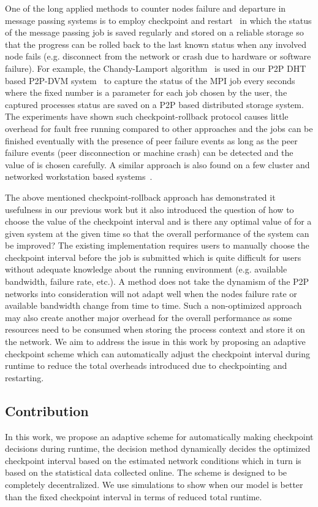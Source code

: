\documentclass[times, 12pt, onecolumn]{article}
\begin{document}
One of the long applied methods to counter nodes failure and departure in message passing systems is to 
employ checkpoint and restart~\cite{DBLP:journals/csur/ElnozahyAWJ02,ChandyL85} in which the status of the 
message passing job is saved regularly and stored on a reliable storage so that the progress can be rolled back 
to the last known status when any involved node fails (e.g. disconnect from the network or crash due to hardware 
or software failure). For example, the Chandy-Lamport algorithm~\cite{ChandyL85} is used in our P2P DHT based 
P2P-DVM system~\cite{dvm} to capture the status of the MPI job every  seconds where the fixed number  is 
a parameter for each job chosen by the user, the captured processes status are saved on a P2P based distributed
storage system. The experiments have shown such checkpoint-rollback protocol causes little overhead for fault free 
running compared to other approaches and the jobs can be finished eventually with the presence of peer failure events 
as long as the peer failure events (peer disconnection or machine crash) can be detected and the value of  is
chosen carefully. A similar approach is also found on a few cluster and networked workstation based systems~\cite{BHKLC06}. 

The above mentioned checkpoint-rollback approach has demonstrated it usefulness in our previous work but it 
also introduced the question of how to choose the value of the checkpoint interval  and is there any 
optimal value of  for a given system at the given time so that the overall performance of the system can be 
improved? The existing implementation requires users to manually choose the checkpoint interval before the job is 
submitted which is quite difficult for 
users without adequate knowledge about the running environment (e.g. available bandwidth, failure rate, etc.). 
A method does not take the dynamism of the P2P networks into consideration will not adapt 
well when the nodes failure rate or available bandwidth change from time to time. Such a non-optimized approach
may also create another major overhead for the overall performance as some resources need to be consumed when storing
the process context and store it on the network. We aim to address the issue in this work by proposing an 
adaptive checkpoint scheme which can automatically adjust the checkpoint interval during runtime to reduce the 
total overheads introduced due to checkpointing and restarting.    

\subsection{Contribution}
In this work, we propose an adaptive scheme for automatically making checkpoint decisions during runtime, 
the decision method dynamically decides the optimized checkpoint interval based on the estimated network 
conditions which in turn is based on the statistical data collected online. The scheme is designed to be
completely decentralized. We use simulations to show when our model is better than the fixed checkpoint 
interval in terms of reduced total runtime.   
\end{document}
